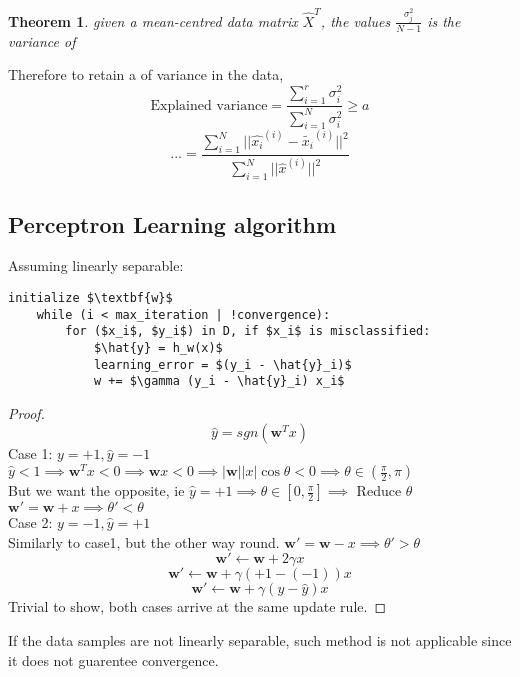 \documentclass{article}
\newtheorem{theorem}{Theorem}[section]
\begin{document}
\begin{theorem}
    given a mean-centred data matrix $\hat{X}^T$, the values $\frac{\sigma_j^2}{N - 1}$ is the variance of 
\end{theorem}
Therefore to retain a of variance in the data, 
\[\text{Explained variance}  = \frac{\sum_{i=1}^{r}\sigma_i^2}{\sum_{i=1}^{N}\sigma_i^2} \geq a\]
\[\text{...} = \frac{\sum_{i=1}^{N}||\hat{x_i}^{(i)} - \tilde{x_i}^{(i)}||^2}{\sum_{i=1}^{N} ||\hat{x}^{(i)}||^2}\]
\newpage








\subsection*{Perceptron Learning algorithm}
Assuming linearly separable:
\begin{lstlisting}[mathescape = true]
    initialize $\textbf{w}$
    while (i < max_iteration | !convergence):
        for ($x_i$, $y_i$) in D, if $x_i$ is misclassified:
            $\hat{y} = h_w(x)$
            learning_error = $(y_i - \hat{y}_i)$
            w += $\gamma (y_i - \hat{y}_i) x_i$
\end{lstlisting}
\begin{proof}
    \[\hat{y} = sgn(\textbf{w}^Tx)\]
Case 1: $y = +1, \hat{y} = -1$\\
\indent $\hat{y} < 1 \implies \textbf{w}^Tx < 0 \implies \textbf{w}x < 0 \implies |\textbf{w}||x|\cos\theta < 0 \implies \theta \in (\frac{\pi}{2}, \pi)$\\
\indent But we want the opposite, ie $\hat{y} = +1 \implies \theta \in [0, \frac{\pi}{2}] \implies$ Reduce $\theta$\\
\indent $\textbf{w}' = \textbf{w} + x \implies \theta' < \theta$ \\
Case 2: $y = -1, \hat{y} = +1$\\
\indent Similarly to case1, but the other way round. $\textbf{w}' = \textbf{w} - x \implies \theta' > \theta$\\
\[\textbf{w}' \leftarrow \textbf{w} + 2\gamma x \]
\[\textbf{w}' \leftarrow \textbf{w} + \gamma(+1 - (-1)) x \]
\[\textbf{w}' \leftarrow \textbf{w} + \gamma(y - \hat{y}) x \]
Trivial to show, both cases arrive at the same update rule.
\end{proof}
If the data samples are not linearly separable, such method is not applicable since it does not guarentee convergence.
\end{document}

